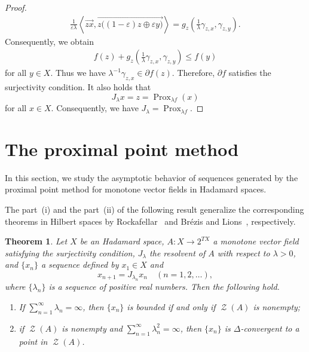 \documentclass[draft]{amsart}
\numberwithin{equation}{section}
\newcommand{\ip}[2]{\left\langle #1, #2 \right\rangle}
\DeclareMathOperator{\Prox}{Prox}
\DeclareMathOperator{\Zer}{\mathcal{Z}}
\theoremstyle{plain}
\newtheorem{theorem}{Theorem}[section]
\theoremstyle{definition}
\theoremstyle{remark}
\begin{document}
\begin{proof}
\begin{align*}
 \frac{1}{\varepsilon \lambda} 
 \ip{\overrightarrow{zx}}{\overrightarrow{z\bigl(
  (1-\varepsilon)z \oplus \varepsilon y
 \bigr)}}
 = g_z\left(
 \frac{1}{\lambda}\gamma_{z,x}, 
 \gamma_{z,y}
 \right). 
\end{align*}
Consequently, we obtain 
\begin{align*}
 f(z) + g_z\left(
 \frac{1}{\lambda}\gamma_{z,x}, 
 \gamma_{z,y}
 \right) 
 \leq f(y)
\end{align*}
for all $y\in X$. Thus we have 
$\lambda^{-1}\gamma_{z, x} 
 \in \partial f(z)$. 
Therefore, $\partial f$ satisfies the surjectivity condition. 
It also holds that 
\[
 J_{\lambda}x = z = \Prox_{\lambda f} (x)
\]
for all $x\in X$. Consequently, 
we have $J_{\lambda}=\Prox_{\lambda f}$. 
\end{proof}

\section{The proximal point method}

In this section, we study the asymptotic behavior of 
sequences generated by the proximal point method 
for monotone vector fields in Hadamard spaces. 

The part~(i) and the part~(ii) of the following result generalize 
the corresponding theorems in Hilbert spaces by 
Rockafellar~\cite{MR0410483} and 
Br\'{e}zis and Lions~\cite{MR491922}, respectively. 

\begin{theorem}\label{thm:PPA-CAT0}
 Let $X$ be an Hadamard space, 
 $A\colon X\to 2^{TX}$ a monotone vector field 
 satisfying the surjectivity condition, 
 $J_{\lambda}$ the resolvent of $A$ with respect to $\lambda>0$, 
 and $\{x_n\}$ a sequence defined by $x_1\in X$ and 
 \[
  x_{n+1} = J_{\lambda_n}x_n \quad (n=1,2,\dots), 
 \]
 where $\{\lambda_n\}$ is a sequence of positive real numbers. 
 Then the following hold. 
 \begin{enumerate}
  \item[(i)] If $\sum_{n=1}^{\infty}\lambda_n = \infty$, 
 then $\{x_n\}$ is bounded if and only if $\Zer (A)$ is nonempty; 
  \item[(ii)] if $\Zer (A)$ is nonempty and 
 $\sum_{n=1}^{\infty}\lambda_n^2 =\infty$, 
 then $\{x_n\}$ is $\Delta$-convergent to 
 a point in $\Zer (A)$. 
 \end{enumerate} 
\end{theorem}
\end{document}
